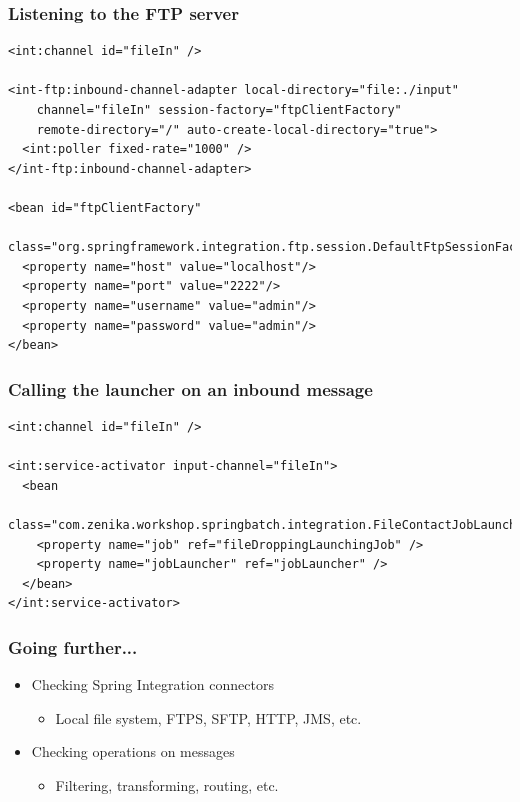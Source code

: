 \begin{frame}[fragile]
 \frametitle{Listening to the FTP server}
 \lstset{language=XML}
 \begin{lstlisting}
<int:channel id="fileIn" />

<int-ftp:inbound-channel-adapter local-directory="file:./input" 
    channel="fileIn" session-factory="ftpClientFactory" 
    remote-directory="/" auto-create-local-directory="true">
  <int:poller fixed-rate="1000" />
</int-ftp:inbound-channel-adapter>

<bean id="ftpClientFactory"
    class="org.springframework.integration.ftp.session.DefaultFtpSessionFactory">
  <property name="host" value="localhost"/>
  <property name="port" value="2222"/>
  <property name="username" value="admin"/>
  <property name="password" value="admin"/>
</bean>
 \end{lstlisting}
\end{frame}

\begin{frame}[fragile]
\frametitle{Calling the launcher on an inbound message}
\lstset{language=XML}
\begin{lstlisting}
<int:channel id="fileIn" />

<int:service-activator input-channel="fileIn">
  <bean 
    class="com.zenika.workshop.springbatch.integration.FileContactJobLauncher">
    <property name="job" ref="fileDroppingLaunchingJob" />
    <property name="jobLauncher" ref="jobLauncher" />
  </bean>
</int:service-activator>
 \end{lstlisting}
\end{frame}

\begin{frame}
 \frametitle{Going further...}
 \begin{itemize}
  \item Checking Spring Integration connectors
  \begin{itemize}
   \item Local file system, FTPS, SFTP, HTTP, JMS, etc.
  \end{itemize}
  \item Checking operations on messages
  \begin{itemize}
   \item Filtering, transforming, routing, etc.
  \end{itemize}
 \end{itemize}
\end{frame}

